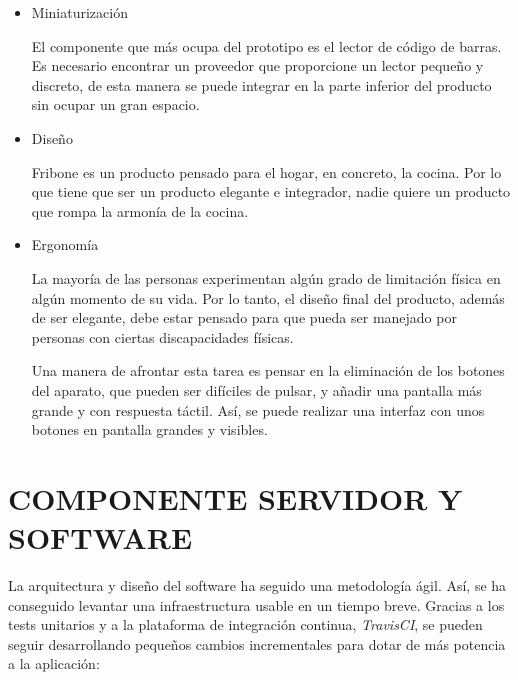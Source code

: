 \begin{itemize}
    \item Miniaturización

        El componente que más ocupa del prototipo es el lector de código de barras. Es necesario encontrar un proveedor que proporcione un lector pequeño y discreto, de esta manera se puede integrar en la parte inferior del producto sin ocupar un gran espacio.

    \item Diseño

        Fribone es un producto pensado para el hogar, en concreto, la cocina. Por lo que tiene que ser un producto elegante e integrador, nadie quiere un producto que rompa la armonía de la cocina.

    \item Ergonomía

        La mayoría de las personas experimentan algún grado de limitación física en algún momento de su vida. Por lo tanto, el diseño final del producto, además de ser elegante, debe estar pensado para que pueda ser manejado por personas con ciertas discapacidades físicas.

        Una manera de afrontar esta tarea es pensar en la eliminación de los botones del aparato, que pueden ser difíciles de pulsar, y añadir una pantalla más grande y con respuesta táctil. Así, se puede realizar una interfaz con unos botones en pantalla grandes y visibles.

\end{itemize}

\section{COMPONENTE SERVIDOR Y SOFTWARE}

La arquitectura y diseño del software ha seguido una metodología ágil. Así, se ha conseguido levantar una infraestructura usable en un tiempo breve. Gracias a los tests unitarios y a la plataforma de integración continua, \emph{TravisCI}, se pueden seguir desarrollando pequeños cambios incrementales para dotar de más potencia a la aplicación:

